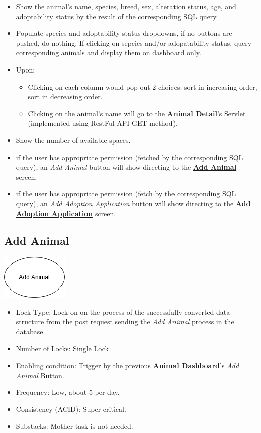 \documentclass[a4paper]{article}
\begin{document}
\begin{itemize}
	\item Show the animal’s name, species, breed, sex, alteration status, age, and adoptability status by the result of the corresponding SQL query.
	\item Populate species and adoptability status dropdowns, if no buttons are pushed, do nothing. If clicking on sepcies and/or adopatability status, query corresponding animals and display them on dashboard only.

	\item Upon: \begin{itemize}
		\item Clicking on each column would pop out 2 choices: sort in increasing order, sort in decreasing order.
		\item Clicking on the animal's name will go to the \underline{\textbf{Animal Detail}}'s Servlet (implemented using RestFul API GET method).
	\end{itemize}
	\item Show the number of available spaces.
	\item if the user has appropriate permission (fetched by the corresponding SQL query), an \textit{Add Animal} button will show directing to the \underline{\textbf{Add Animal}} screen.
        \item if the user has appropriate permission (fetch by the corresponding SQL query), an \textit{Add Adoption Application} button will show directing to the \underline{\textbf{Add Adoption Application}} screen.
\end{itemize}

\hypertarget{add_animal}{\subsection{Add Animal}}
\includegraphics[scale = 0.6]{add_animal.png}

\begin{itemize}
	\item Lock Type: Lock on on the process of the successfully converted data structure from the post request sending the \textit{Add Animal} process in the database.
	\item Number of Locks: Single Lock
	\item Enabling condition: Trigger by the previous \underline{\textbf{Animal Dashboard}}'s \textit{Add Animal} Button.
	\item Frequency: Low, about 5 per day.
	\item Consistency (ACID): Super critical.
	\item Substacks: Mother task is not needed.
\end{itemize}
\end{document}
